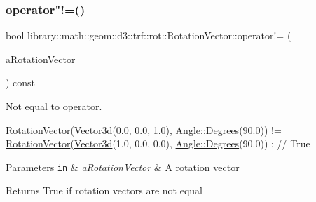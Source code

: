 \subsubsection{\texorpdfstring{operator"!=()}{operator!=()}}
{\footnotesize\ttfamily bool library\+::math\+::geom\+::d3\+::trf\+::rot\+::\+Rotation\+Vector\+::operator!= (\begin{DoxyParamCaption}\item[{const \hyperlink{classlibrary_1_1math_1_1geom_1_1d3_1_1trf_1_1rot_1_1_rotation_vector}{Rotation\+Vector} \&}]{a\+Rotation\+Vector }\end{DoxyParamCaption}) const}



Not equal to operator. 


\begin{DoxyCode}
\hyperlink{classlibrary_1_1math_1_1geom_1_1d3_1_1trf_1_1rot_1_1_rotation_vector_a49076a279f457fdb14c4a9d4d61e1738}{RotationVector}(\hyperlink{namespacelibrary_1_1math_1_1obj_a977e84e9bf317a4e7dd9d6d671d6da2f}{Vector3d}(0.0, 0.0, 1.0), \hyperlink{classlibrary_1_1math_1_1geom_1_1_angle_a64aa53e8420aeb6f671d86c65c370bc8}{Angle::Degrees}(90.0)) != 
      \hyperlink{classlibrary_1_1math_1_1geom_1_1d3_1_1trf_1_1rot_1_1_rotation_vector_a49076a279f457fdb14c4a9d4d61e1738}{RotationVector}(\hyperlink{namespacelibrary_1_1math_1_1obj_a977e84e9bf317a4e7dd9d6d671d6da2f}{Vector3d}(1.0, 0.0, 0.0), \hyperlink{classlibrary_1_1math_1_1geom_1_1_angle_a64aa53e8420aeb6f671d86c65c370bc8}{Angle::Degrees}(90.0)) ; \textcolor{comment}{// True}
\end{DoxyCode}



\begin{DoxyParams}[1]{Parameters}
\mbox{\tt in}  & {\em a\+Rotation\+Vector} & A rotation vector \\
\hline
\end{DoxyParams}
\begin{DoxyReturn}{Returns}
True if rotation vectors are not equal 
\end{DoxyReturn}
\mbox{\label{classlibrary_1_1math_1_1geom_1_1d3_1_1trf_1_1rot_1_1_rotation_vector_a3e56f843ce247d75d93a99defa47b386}} 
